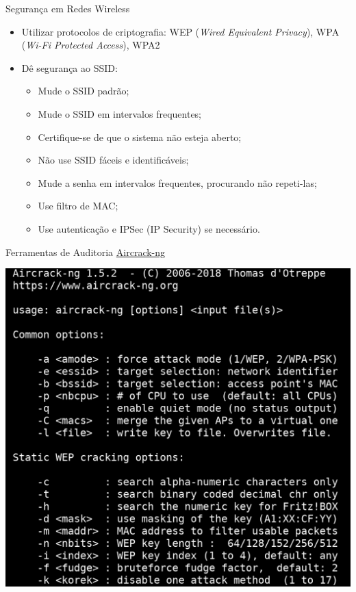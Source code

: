 \begin{frame}{Segurança em Redes Wireless}
  
  \begin{itemize}[<+->]
  \item Utilizar protocolos de criptografia: WEP ({\em Wired
      Equivalent Privacy}), WPA ({\em Wi-Fi Protected Access}), WPA2
  \item Dê segurança ao SSID:
\begin{itemize}[<+->]
  \item Mude o SSID padrão;
  \item Mude o SSID em intervalos frequentes;
  \item Certifique-se de que o sistema não esteja aberto;
  \item Não use SSID fáceis e identificáveis;
  \item Mude a senha em intervalos frequentes, procurando não repeti-las;
  \item Use filtro de MAC;
  \item Use autenticação e IPSec (IP Security) se necessário.
\end{itemize}
\end{itemize}

\end{frame}


\begin{frame}{Ferramentas de Auditoria}
\href{https://www.aircrack-ng.org/}{Aircrack-ng}\bigskip

\includegraphics[scale=.2]{aircrack-ng.png}

\end{frame}

